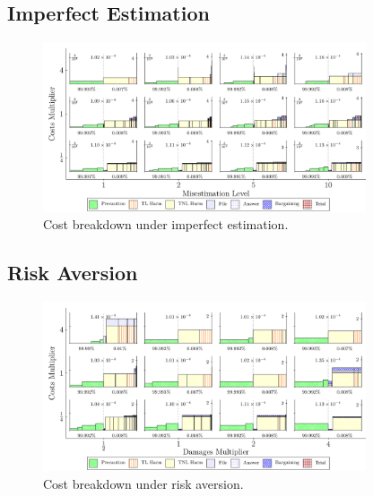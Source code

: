 \documentclass{article}
\begin{document}
\FloatBarrier
\subsection{Imperfect Estimation}
\begin{figure}[ht]
  \centering
  \includegraphics[width=0.85\textwidth]{../Figures/Cost Breakdown Misestimation Level (All Rows).pdf}
  \caption{Cost breakdown under imperfect estimation.}
  \label{fig:imperfect_estimation}
\end{figure}

\FloatBarrier
\subsection{Risk Aversion}
\begin{figure}[ht]
  \centering
  \includegraphics[width=0.85\textwidth]{../Figures/Cost Breakdown Damages Multiplier (Risk Averse) (All Rows).pdf}
  \caption{Cost breakdown under risk aversion.}
  \label{fig:risk_aversion}
\end{figure}

\FloatBarrier
\end{document}
